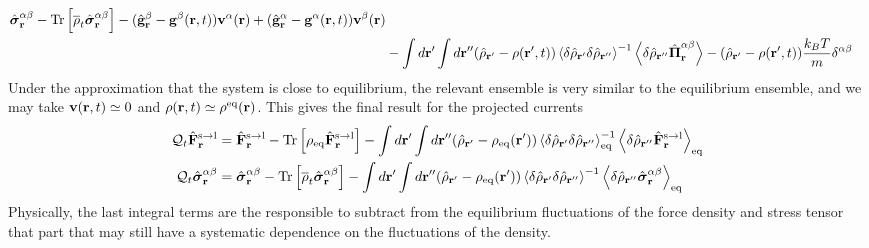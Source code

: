 \documentclass[b5paper,openright,11pt]{book}
\newcommand{\llangle}{\left\langle}
\newcommand{\rrangle}{\right\rangle}
\begin{document}
\begin{appendices}
\begin{align}
\hat{\boldsymbol{\sigma}}^{\alpha\beta}_{{\bf r}}-{\rm Tr}\left[\overline{\rho}_t\hat{\boldsymbol{\sigma}}^{\alpha\beta}_{{\bf r}}\right]
-(\hat{\bf g}^\beta_{{\bf r}}-{\bf g}^\beta({\bf r},t))
{\bf v}^\alpha({\bf r})+
(\hat{\bf g}^\alpha_{{\bf r}}-{\bf g}^\alpha({\bf r},t))
{\bf v}^\beta({\bf r})
\nonumber\\
&-\int d{\bf r}'\int d{\bf r}''(\hat{\rho}_{{\bf r}'}-{\rho}({\bf r}',t))
\llangle \delta\hat{\rho}_{{\bf r}'}\delta\hat{\rho}_{{\bf r}''}\rrangle^{-1}
\llangle \delta \hat{\rho}_{{\bf r}''}\hat{\boldsymbol{\Pi}}^{\alpha\beta}_{{\bf r}}\rrangle
-(\hat{\rho}_{{\bf r}'}-\rho({\bf r}',t))\frac{k_BT}{m}\delta^{\alpha\beta}
\label{QFS}
\end{align}
Under the approximation  that the system is close  to equilibrium, the
relevant ensemble is very similar  to the equilibrium ensemble, and we
may  take  ${\bf v}({\bf  r},t)\simeq  0$  and $\rho({\bf  r},t)\simeq
\rho^{\rm eq}({\bf r})$. This gives the final result for the projected
currents
\begin{align}
    {\cal Q}_t\hat{\bf F}^{\rm s\to l}_{{\bf r}}&=
\hat{\bf F}^{\rm s\to l}_{{\bf r}}- {\rm Tr}\left[\rho_{\rm eq}\hat{\bf F}^{\rm s\to l}_{{\bf r}}\right]
-\int d{\bf r}'\int d{\bf r}''(\hat{\rho}_{{\bf r}'}-{\rho}_{\rm eq}({\bf r}'))
\llangle \delta\hat{\rho}_{{\bf r}'}\delta\hat{\rho}_{{\bf r}''}\rrangle_{\rm eq}^{-1}
\llangle \delta \hat{\rho}_{{\bf r}''}\hat{\bf F}^{\rm s\to l}_{{\bf r}}\rrangle_{\rm eq}
\nonumber\\
  {\cal Q}_t\hat{\boldsymbol{\sigma}}^{\alpha\beta}_{{\bf r}}&=
\hat{\boldsymbol{\sigma}}^{\alpha\beta}_{{\bf r}}-{\rm Tr}\left[\overline{\rho}_t\hat{\boldsymbol{\sigma}}^{\alpha\beta}_{{\bf r}}\right]
-\int d{\bf r}'\int d{\bf r}''(\hat{\rho}_{{\bf r}'}-{\rho}_{\rm eq}({\bf r}'))
\llangle \delta\hat{\rho}_{{\bf r}'}\delta\hat{\rho}_{{\bf r}''}\rrangle^{-1}
\llangle \delta \hat{\rho}_{{\bf r}''}\hat{\boldsymbol{\sigma}}^{\alpha\beta}_{{\bf r}}\rrangle_{\rm eq}
\label{QFSeq}
\end{align}
Physically,  the  last integral terms    are  the  responsible  to
subtract from the  equilibrium fluctuations of the  force density and
stress tensor that part that may still have a systematic dependence on
the  fluctuations  of  the  density.  




\end{appendices}
\end{document}
